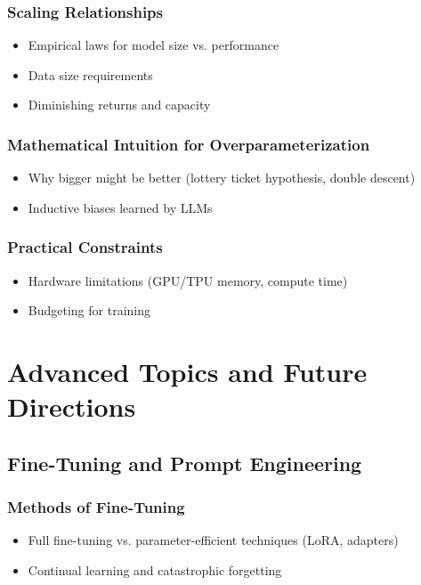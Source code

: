 \documentclass[12pt]{book}
\begin{document}
\section{Scaling Relationships}
\begin{itemize}
    \item Empirical laws for model size vs. performance
    \item Data size requirements
    \item Diminishing returns and capacity
\end{itemize}

\section{Mathematical Intuition for Overparameterization}
\begin{itemize}
    \item Why bigger might be better (lottery ticket hypothesis, double descent)
    \item Inductive biases learned by LLMs
\end{itemize}

\section{Practical Constraints}
\begin{itemize}
    \item Hardware limitations (GPU/TPU memory, compute time)
    \item Budgeting for training
\end{itemize}


\part{Advanced Topics and Future Directions}

\chapter{Fine-Tuning and Prompt Engineering}
\section{Methods of Fine-Tuning}
\begin{itemize}
    \item Full fine-tuning vs. parameter-efficient techniques (LoRA, adapters)
    \item Continual learning and catastrophic forgetting
\end{itemize}
\end{document}
